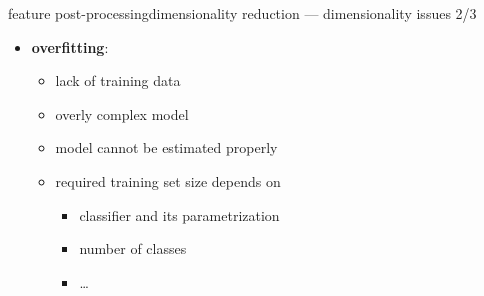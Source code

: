 		\begin{frame}{feature post-processing}{dimensionality reduction --- dimensionality issues 2/3}
            \begin{itemize}
                \item   \textbf{overfitting}:
                    \begin{itemize}
                        \item   lack of training data
                        \item   overly complex model
                        \item[$\Rightarrow$]<2-> model cannot be estimated properly
                    \end{itemize}
                    
                    \bigskip
                    \begin{itemize}
                        \item<3-> required training set size depends on 
                            \begin{itemize}
                                \item   classifier and its parametrization
                                \item   number of classes
                                \item   \ldots
                            \end{itemize}
                    \end{itemize}
                    \pause
			\end{itemize}
		\end{frame}
